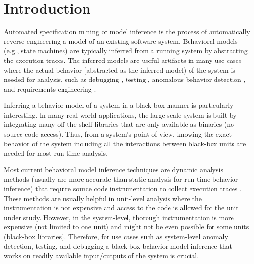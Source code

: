 \chapter{Introduction}
\label{sec:intro}
Automated specification mining or model inference \cite{lo2011mining} is the process of automatically reverse engineering a model of an existing software system. Behavioral models (e.g., state machines) are typically inferred from a running system by abstracting the execution traces. The inferred models are useful artifacts in many use cases where the actual behavior (abstracted as the inferred model) of the system is needed for analysis, such as debugging \cite{hybriddebugging, shang2013assisting, jafar2019interactive}, testing \cite{Walkinshaw2018TestingBlackBox, ModelBasedTesting, Papadopoulos2015, dallmeier2011automatically}, anomalous behavior detection \cite{valdes2000adaptive}, and requirements engineering \cite{damas2005generating}. 

Inferring a behavior model of a system in a black-box manner is particularly interesting. In many real-world applications, the large-scale system is built by integrating many off-the-shelf libraries that are only available as binaries (no source code access). Thus, from a system's point of view, knowing the exact behavior of the system including all the interactions between black-box units are needed for most run-time analysis. 

Most current behavioral model inference techniques are dynamic analysis methods (usually are more accurate than static analysis for run-time behavior inference) that require source code instrumentation to collect execution traces \cite{lo2011mining}. These methods are usually helpful in unit-level analysis where the instrumentation is not expensive and access to the code is allowed for the unit under study. However, in the system-level, thorough instrumentation is more expensive (not limited to one unit) and might not be even possible for some units (black-box libraries). Therefore, for use cases such as system-level anomaly detection, testing, and debugging a black-box behavior model inference that works on readily available input/outputs of the system is crucial. 


